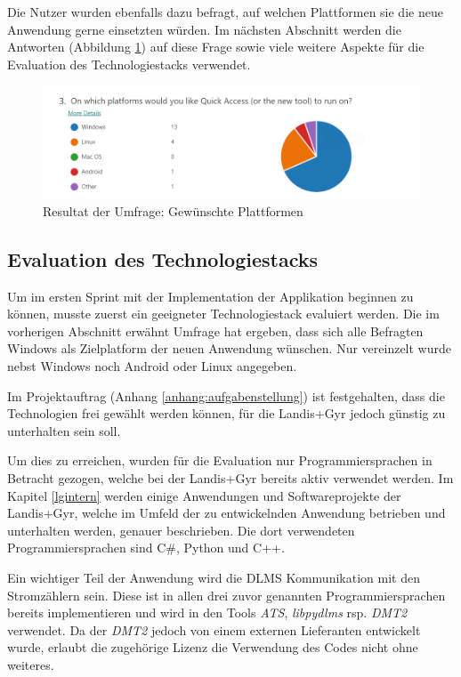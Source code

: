 Die Nutzer wurden ebenfalls dazu befragt, auf welchen Plattformen sie die neue Anwendung gerne einsetzten würden.
Im nächsten Abschnitt werden die Antworten (Abbildung \ref{fig:SurveryPlatforms}) auf diese Frage sowie viele weitere Aspekte für die Evaluation des Technologiestacks verwendet.

\begin{figure}[H]
   \centering
   \includegraphics[width=1.0\textwidth]{gfx/S0_Survey_Platform.png}
   \caption{
       Resultat der Umfrage: Gewünschte Plattformen
   }
   \label{fig:SurveryPlatforms}
\end{figure}

\subsection{Evaluation des Technologiestacks}
Um im ersten Sprint mit der Implementation der Applikation beginnen zu können, musste zuerst ein geeigneter Technologiestack evaluiert werden.
Die im vorherigen Abschnitt erwähnt Umfrage hat ergeben, dass sich alle Befragten Windows als Zielplatform der neuen Anwendung wünschen.
Nur vereinzelt wurde nebst Windows noch Android oder Linux angegeben.

Im Projektauftrag (Anhang \ref{anhang:aufgabenstellung}) ist festgehalten, dass die Technologien frei gewählt werden können, für die Landis+Gyr jedoch günstig zu unterhalten sein soll.

Um dies zu erreichen, wurden für die Evaluation nur Programmiersprachen in Betracht gezogen, welche bei der Landis+Gyr bereits aktiv verwendet werden.
Im Kapitel \ref{lgintern} werden einige Anwendungen und Softwareprojekte der Landis+Gyr, welche im Umfeld der zu entwickelnden Anwendung betrieben und unterhalten werden, genauer beschrieben.
Die dort verwendeten Programmiersprachen sind C\#, Python und C++.


Ein wichtiger Teil der Anwendung wird die \ac{DLMS} Kommunikation mit den Stromzählern sein.
Diese ist in allen drei zuvor genannten Programmiersprachen bereits implementieren und wird in den Tools \textit{ATS}, \textit{libpydlms} rsp. \textit{DMT2} verwendet.
Da der \textit{DMT2} jedoch von einem externen Lieferanten entwickelt wurde, erlaubt die zugehörige Lizenz die Verwendung des Codes nicht ohne weiteres.


